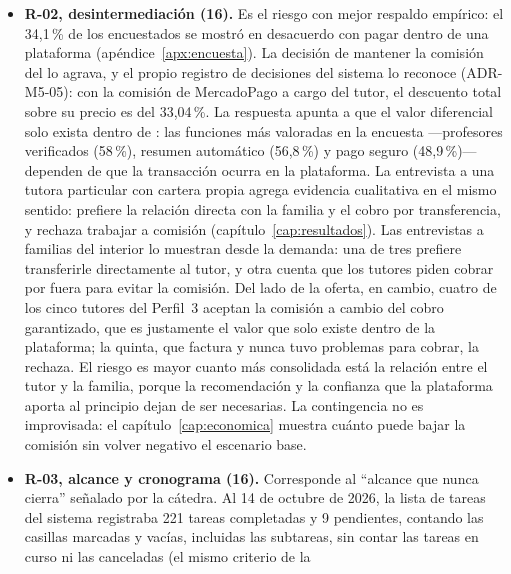 \begin{itemize}
    \item \textbf{R-02, desintermediación (16).} Es el riesgo con mejor
          respaldo empírico: el 34,1\,\% de los encuestados se mostró en
          desacuerdo con pagar dentro de una plataforma
          (apéndice~\ref{apx:encuesta}). La decisión de mantener la
          comisión del \comision{} lo agrava, y el propio registro de
          decisiones del sistema lo reconoce (ADR-M5-05): con la comisión
          de MercadoPago a cargo del tutor, el descuento total sobre su
          precio es del 33,04\,\%. La respuesta apunta a que el valor
          diferencial solo exista dentro de \sistema{}: las funciones más
          valoradas en la encuesta ---profesores verificados (58\,\%),
          resumen automático (56,8\,\%) y pago seguro (48,9\,\%)--- dependen
          de que la transacción ocurra en la plataforma. La entrevista a
          una tutora particular con cartera propia agrega evidencia
          cualitativa en el mismo sentido: prefiere la relación directa con
          la familia y el cobro por transferencia, y rechaza trabajar a
          comisión (capítulo~\ref{cap:resultados}). Las entrevistas a
          familias del interior lo muestran desde la demanda: una de tres
          prefiere transferirle directamente al tutor, y otra cuenta que
          los tutores piden cobrar por fuera para evitar la comisión. Del
          lado de la oferta, en cambio, cuatro de los cinco tutores del
          Perfil~3 aceptan la comisión a cambio del cobro garantizado, que
          es justamente el valor que solo existe dentro de la plataforma;
          la quinta, que factura y nunca tuvo problemas para cobrar, la
          rechaza. El riesgo es mayor
          cuanto más consolidada está la relación entre el tutor y la
          familia, porque la recomendación y la confianza que la plataforma
          aporta al principio dejan de ser necesarias. La contingencia
          no es improvisada: el capítulo~\ref{cap:economica} muestra cuánto
          puede bajar la comisión sin volver negativo el escenario base.
    \item \textbf{R-03, alcance y cronograma (16).} Corresponde al
          ``alcance que nunca cierra'' señalado por la cátedra. Al 14 de
          octubre de 2026, la lista de tareas del sistema registraba 221
          tareas completadas y 9 pendientes, contando las casillas
          marcadas y vacías, incluidas las subtareas, sin contar las
          tareas en curso ni las canceladas (el mismo criterio de la

\end{itemize}
